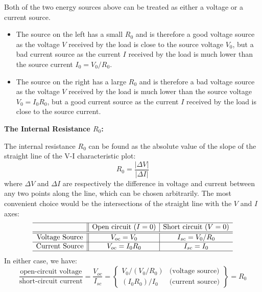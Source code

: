 \documentclass{article}
\begin{document}
Both of the two energy sources above can be treated as either a voltage 
or a current source. 
\begin{itemize}
\item The source on the left has a small $R_0$ and is therefore a good 
  voltage source as the voltage $V$ received by the load is close to 
  the source voltage $V_0$, but a bad current source as the current $I$ 
  received by the load is much lower than the source current $I_0=V_0/R_0$. 
\item The source on the right has a large $R_0$ and is therefore a bad 
  voltage source as the voltage $V$ received by the load is much lower 
  than the source voltage $V_0=I_0R_0$, but a good current source as the 
  current $I$ received by the load is close to the source current.
\end{itemize}


{\bf The Internal Resistance $R_0$:}

The internal resistance $R_0$ can be found as the absolute value of the 
slope of the straight line of the V-I characteristic plot:
\begin{equation}
  R_0=\frac{|\Delta V|}{|\Delta I|}
\end{equation}
where $\Delta V$ and $\Delta I$ are respectively the difference in voltage 
and current between any two points along the line, which can be chosen 
arbitrarily. The most convenient choice would be the intersections of the 
straight line with the $V$ and $I$ axes:
\begin{equation}
  \begin{array}{c||c|c}\hline
    & \mbox{Open circuit ($I=0$)} & \mbox{Short circuit ($V=0$)} \\ \hline\hline
    \mbox{Voltage Source} & V_{oc}=V_0 & I_{sc}=V_0/R_0 \\ \hline
    \mbox{Current Source} & V_{oc}=I_0R_0 & I_{sc}=I_0 \\ \hline
  \end{array}
\end{equation}
In either case, we have:
\begin{equation}
  \frac{\mbox{open-circuit voltage}}{\mbox{short-circuit current}}
  =\frac{V_{oc}}{I_{sc}}=\left\{\begin{array}{cc}V_0/(V_0/R_0)&\mbox{(voltage source)}\\
  (I_0R_0)/I_0&\mbox{(current source)}\end{array}\right\}=R_0
\end{equation}
\begin{comment}
\begin{itemize}
\item For voltage source $(V_0, R_0)$, the open-circuit voltage is 
  $V_{oc}=V_0$, the short-circuit current is $I_{sc}=V_0/R_0$, and their 
  ratio is $R_0$. 
\item For current source with $(I_0, R_0)$, the open-circuit voltage is 
  $V_{oc}=I_0R_0$, the short-circuit current is $I_{sc}=I_0$, and their 
  ratio is $R_0$.
\end{itemize}
\end{comment}
\end{document}
